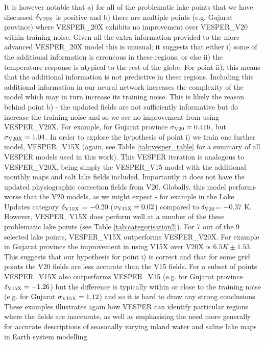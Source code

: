 \documentclass[hess, twostagejnl]{copernicus}
\begin{document}
It is however notable that a) for all of the problematic lake points that we have discussed $\delta_{\rm V20X}$ is positive and b) there are multiple points (e.g. Gujarat province) where VESPER\_20X exhibits no improvement over VESPER\_V20 within training noise. Given all the extra information provided to the more advanced VESPER\_20X model this is unusual; it suggests that either i) some of the additional information is erroneous in these regions, or else ii) the temperature response is atypical to the rest of the globe. For point ii), this means that the additional information is not predictive in these regions. Including this additional information in our neural network increases the complexity of the model which may in turn increase its training noise. This is likely the reason behind point b) - the updated fields are not sufficiently informative but do increase the training noise and so we see no improvement from using VESPER\_V20X. For example, for Gujarat province $\sigma_{\rm V20} = 0.416$, but $\sigma_{\rm V20X} = 1.04$. In order to explore the hypothesis of point i) we train one further model, VESPER\_V15X (again, see Table \ref{tab:vesper_table} for a summary of all VESPER models used in this work). This VESPER iteration is analogous to VESPER\_V20X, being simply the VESPER\_V15 model with the additional monthly maps and salt lake fields included. Importantly it does not have the updated physiographic correction fields from V20. Globally, this model performs worse that the V20 models, as we might expect - for example in the Lake Updates category $\delta_{\rm V15X}$ = −0.20 ($\sigma_{\rm V15X} = 0.02$) compared to $\delta_{\rm V20}$= −0.37 K. However, VESPER\_V15X does perform well at a number of the these problematic lake points (see Table \ref{tab:categorisation2}). For 7 out of the 9 selected lake points, VESPER\_V15X outperforms VESPER\_V20X. For example in Gujarat province the improvement in using V15X over V20X is $6.5K \pm 1.53$. This suggests that our hypothesis for point i) is correct and that for some grid points the V20 fields are less accurate than the V15 fields. For a subset of points VESPER\_V15X also outperforms VESPER\_V15 (e.g. for Gujarat province $\delta_{\rm V15X} = -1.26$) but the difference is typically within or close to the training noise (e.g. for Gujarat $\sigma_{\rm V15X} = 1.12$) and so it is hard to draw any strong conclusions.  These examples illustrates again how VESPER can identify particular regions where the fields are inaccurate, as well as emphasising the need more generally for accurate descriptions of seasonally varying inland water and saline lake maps in Earth system modelling.
\end{document}
